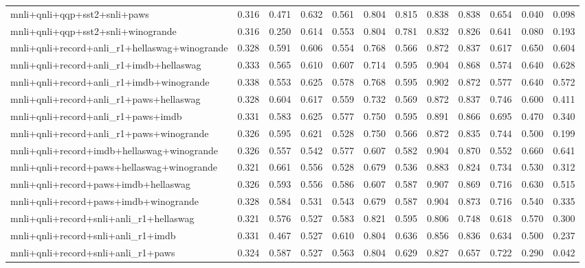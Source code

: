 \begin{table}[t]
\begin{tabular}{lrrrrrrrrrrr}
    mnli+qnli+qqp+sst2+snli+paws & 0.316 & 0.471 & 0.632 & 0.561 & 0.804 & 0.815 & 0.838 & 0.838 & 0.654 & 0.040 & 0.098 \\
    mnli+qnli+qqp+sst2+snli+winogrande & 0.316 & 0.250 & 0.614 & 0.553 & 0.804 & 0.781 & 0.832 & 0.826 & 0.641 & 0.080 & 0.193 \\
    mnli+qnli+record+anli\_r1+hellaswag+winogrande & 0.328 & 0.591 & 0.606 & 0.554 & 0.768 & 0.566 & 0.872 & 0.837 & 0.617 & 0.650 & 0.604 \\
    mnli+qnli+record+anli\_r1+imdb+hellaswag & 0.333 & 0.565 & 0.610 & 0.607 & 0.714 & 0.595 & 0.904 & 0.868 & 0.574 & 0.640 & 0.628 \\
    mnli+qnli+record+anli\_r1+imdb+winogrande & 0.338 & 0.553 & 0.625 & 0.578 & 0.768 & 0.595 & 0.902 & 0.872 & 0.577 & 0.640 & 0.572 \\
    mnli+qnli+record+anli\_r1+paws+hellaswag & 0.328 & 0.604 & 0.617 & 0.559 & 0.732 & 0.569 & 0.872 & 0.837 & 0.746 & 0.600 & 0.411 \\
    mnli+qnli+record+anli\_r1+paws+imdb & 0.331 & 0.583 & 0.625 & 0.577 & 0.750 & 0.595 & 0.891 & 0.866 & 0.695 & 0.470 & 0.340 \\
    mnli+qnli+record+anli\_r1+paws+winogrande & 0.326 & 0.595 & 0.621 & 0.528 & 0.750 & 0.566 & 0.872 & 0.835 & 0.744 & 0.500 & 0.199 \\
    mnli+qnli+record+imdb+hellaswag+winogrande & 0.326 & 0.557 & 0.542 & 0.577 & 0.607 & 0.582 & 0.904 & 0.870 & 0.552 & 0.660 & 0.641 \\
    mnli+qnli+record+paws+hellaswag+winogrande & 0.321 & 0.661 & 0.556 & 0.528 & 0.679 & 0.536 & 0.883 & 0.824 & 0.734 & 0.530 & 0.312 \\
    mnli+qnli+record+paws+imdb+hellaswag & 0.326 & 0.593 & 0.556 & 0.586 & 0.607 & 0.587 & 0.907 & 0.869 & 0.716 & 0.630 & 0.515 \\
    mnli+qnli+record+paws+imdb+winogrande & 0.328 & 0.584 & 0.531 & 0.543 & 0.679 & 0.587 & 0.904 & 0.873 & 0.716 & 0.540 & 0.335 \\
    mnli+qnli+record+snli+anli\_r1+hellaswag & 0.321 & 0.576 & 0.527 & 0.583 & 0.821 & 0.595 & 0.806 & 0.748 & 0.618 & 0.570 & 0.300 \\
    mnli+qnli+record+snli+anli\_r1+imdb & 0.331 & 0.467 & 0.527 & 0.610 & 0.804 & 0.636 & 0.856 & 0.836 & 0.634 & 0.500 & 0.237 \\
    mnli+qnli+record+snli+anli\_r1+paws & 0.324 & 0.587 & 0.527 & 0.563 & 0.804 & 0.629 & 0.827 & 0.657 & 0.722 & 0.290 & 0.042 \\

\end{tabular}
\end{table}

